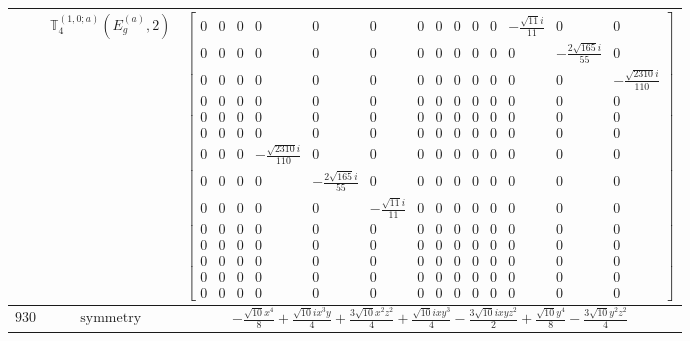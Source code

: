 \documentclass[fleqn,8pt,landscape]{jsarticle}
\begin{document}
\begin{longtable}{ccc}
$  $ & $ \mathbb{T}_{4}^{(1,0;a)}(E_{g}^{(a)},2) $ & $ \begin{bmatrix} 0 & 0 & 0 & 0 & 0 & 0 & 0 & 0 & 0 & 0 & 0 & - \frac{\sqrt{11} i}{11} & 0 & 0 \\ 0 & 0 & 0 & 0 & 0 & 0 & 0 & 0 & 0 & 0 & 0 & 0 & - \frac{2 \sqrt{165} i}{55} & 0 \\ 0 & 0 & 0 & 0 & 0 & 0 & 0 & 0 & 0 & 0 & 0 & 0 & 0 & - \frac{\sqrt{2310} i}{110} \\ 0 & 0 & 0 & 0 & 0 & 0 & 0 & 0 & 0 & 0 & 0 & 0 & 0 & 0 \\ 0 & 0 & 0 & 0 & 0 & 0 & 0 & 0 & 0 & 0 & 0 & 0 & 0 & 0 \\ 0 & 0 & 0 & 0 & 0 & 0 & 0 & 0 & 0 & 0 & 0 & 0 & 0 & 0 \\ 0 & 0 & 0 & - \frac{\sqrt{2310} i}{110} & 0 & 0 & 0 & 0 & 0 & 0 & 0 & 0 & 0 & 0 \\ 0 & 0 & 0 & 0 & - \frac{2 \sqrt{165} i}{55} & 0 & 0 & 0 & 0 & 0 & 0 & 0 & 0 & 0 \\ 0 & 0 & 0 & 0 & 0 & - \frac{\sqrt{11} i}{11} & 0 & 0 & 0 & 0 & 0 & 0 & 0 & 0 \\ 0 & 0 & 0 & 0 & 0 & 0 & 0 & 0 & 0 & 0 & 0 & 0 & 0 & 0 \\ 0 & 0 & 0 & 0 & 0 & 0 & 0 & 0 & 0 & 0 & 0 & 0 & 0 & 0 \\ 0 & 0 & 0 & 0 & 0 & 0 & 0 & 0 & 0 & 0 & 0 & 0 & 0 & 0 \\ 0 & 0 & 0 & 0 & 0 & 0 & 0 & 0 & 0 & 0 & 0 & 0 & 0 & 0 \\ 0 & 0 & 0 & 0 & 0 & 0 & 0 & 0 & 0 & 0 & 0 & 0 & 0 & 0 \end{bmatrix} $ \\ \hline
$ 930 $ & $ \text{symmetry} $ & $ - \frac{\sqrt{10} x^{4}}{8} + \frac{\sqrt{10} i x^{3} y}{4} + \frac{3 \sqrt{10} x^{2} z^{2}}{4} + \frac{\sqrt{10} i x y^{3}}{4} - \frac{3 \sqrt{10} i x y z^{2}}{2} + \frac{\sqrt{10} y^{4}}{8} - \frac{3 \sqrt{10} y^{2} z^{2}}{4} $ \\

\end{longtable}
\end{document}
